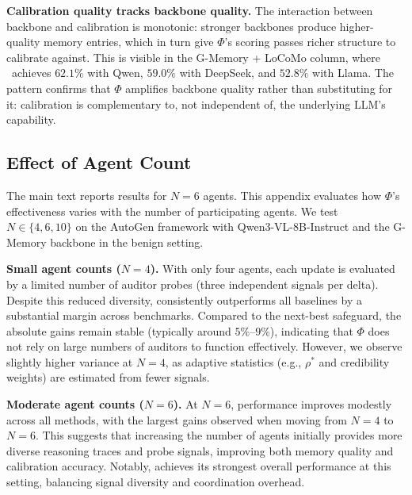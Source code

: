 \textbf{Calibration quality tracks backbone
quality.}
The interaction between backbone and calibration is
monotonic: stronger backbones produce higher-quality
memory entries, which in turn give $\Phi$'s scoring
passes richer structure to calibrate against.
This is visible in the G-Memory + LoCoMo column,
where \system\ achieves $62.1\%$ with Qwen,
$59.0\%$ with DeepSeek, and $52.8\%$ with Llama.
The pattern confirms that $\Phi$ amplifies backbone
quality rather than substituting for it: calibration
is complementary to, not independent of, the
underlying LLM's capability.







\subsection{Effect of Agent Count}
\label{app:agent_scaling}

The main text reports results for $N = 6$ agents.
This appendix evaluates how $\Phi$'s effectiveness
varies with the number of participating agents.
We test $N \in \{4, 6, 10\}$ on the AutoGen framework
with Qwen3-VL-8B-Instruct and the G-Memory backbone in the
benign setting.



\textbf{Small agent counts ($N = 4$).}
With only four agents, each update is evaluated by a
limited number of auditor probes (three independent
signals per delta). Despite this reduced diversity,
\system consistently outperforms all baselines by a
substantial margin across benchmarks. Compared to the
next-best safeguard, the absolute gains remain stable
(typically around $5\%$--$9\%$), indicating that
$\Phi$ does not rely on large numbers of auditors to
function effectively. However, we observe slightly
higher variance at $N = 4$, as adaptive statistics
(e.g., $\rho^*$ and credibility weights) are estimated
from fewer signals.

\textbf{Moderate agent counts ($N = 6$).}
At $N = 6$, performance improves modestly across all
methods, with the largest gains observed when moving
from $N = 4$ to $N = 6$. This suggests that increasing
the number of agents initially provides more diverse
reasoning traces and probe signals, improving both
memory quality and calibration accuracy. Notably,
\system achieves its strongest overall performance at
this setting, balancing signal diversity and
coordination overhead.

